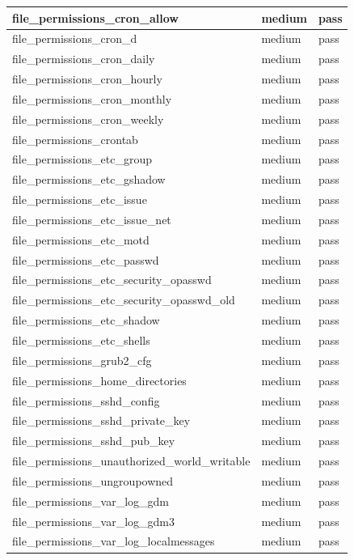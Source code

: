 \begin{longtable}{|p{10cm}|p{2cm}|p{2cm}|}
\hline
file\_permissions\_cron\_allow & medium & pass \\
\hline
file\_permissions\_cron\_d & medium & pass \\
\hline
file\_permissions\_cron\_daily & medium & pass \\
\hline
file\_permissions\_cron\_hourly & medium & pass \\
\hline
file\_permissions\_cron\_monthly & medium & pass \\
\hline
file\_permissions\_cron\_weekly & medium & pass \\
\hline
file\_permissions\_crontab & medium & pass \\
\hline
file\_permissions\_etc\_group & medium & pass \\
\hline
file\_permissions\_etc\_gshadow & medium & pass \\
\hline
file\_permissions\_etc\_issue & medium & pass \\
\hline
file\_permissions\_etc\_issue\_net & medium & pass \\
\hline
file\_permissions\_etc\_motd & medium & pass \\
\hline
file\_permissions\_etc\_passwd & medium & pass \\
\hline
file\_permissions\_etc\_security\_opasswd & medium & pass \\
\hline
file\_permissions\_etc\_security\_opasswd\_old & medium & pass \\
\hline
file\_permissions\_etc\_shadow & medium & pass \\
\hline
file\_permissions\_etc\_shells & medium & pass \\
\hline
file\_permissions\_grub2\_cfg & medium & pass \\
\hline
file\_permissions\_home\_directories & medium & pass \\
\hline
file\_permissions\_sshd\_config & medium & pass \\
\hline
file\_permissions\_sshd\_private\_key & medium & pass \\
\hline
file\_permissions\_sshd\_pub\_key & medium & pass \\
\hline
file\_permissions\_unauthorized\_world\_writable & medium & pass \\
\hline
file\_permissions\_ungroupowned & medium & pass \\
\hline
file\_permissions\_var\_log\_gdm & medium & pass \\
\hline
file\_permissions\_var\_log\_gdm3 & medium & pass \\
\hline
file\_permissions\_var\_log\_localmessages & medium & pass \\

\end{longtable}

